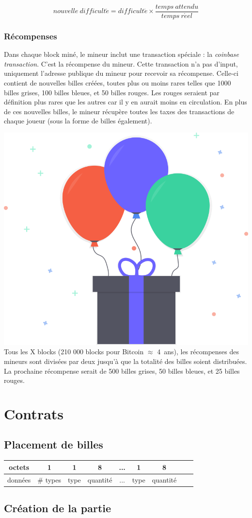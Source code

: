\documentclass{article}
\begin{document}
\[ nouvelle\ difficult\acute{e} = difficult\acute{e} \times \frac{temps\ attendu}{temps\ r\acute{e}el} \]

\subsubsection{Récompenses}
Dans chaque block miné, le mineur inclut une transaction spéciale : la \textit{coinbase transaction}. C'est la récompense du mineur.
Cette transaction n'a pas d'input, uniquement l'adresse publique du mineur pour recevoir sa récompense.
Celle-ci contient de nouvelles billes créées, toutes plus ou moins rares telles que 1000 billes grises, 100 billes bleues, et 50 billes rouges. Les rouges seraient par définition plus rares que les autres car il y en aurait moins en circulation.
En plus de ces nouvelles billes, le mineur récupère toutes les taxes des transactions de chaque joueur (sous la forme de billes également).

\includegraphics[width=0.3\linewidth]{assets/gift.png}\\

Tous les X blocks (210 000 blocks pour Bitcoin $\approx$ 4\ ans), les récompenses des mineurs sont divisées par deux jusqu'à que la totalité des billes soient distribuées.
La prochaine récompense serait de 500 billes grises, 50 billes bleues, et 25 billes rouges.

\section{Contrats}
\subsection*{Placement de billes}
\hspace*{-1cm}%
\begin{tabular}{ |c|c|c|c|c|c|c|c|c| } 
 \hline
octets & 1 & 1 & 8 & ... & 1 & 8\\ 
 \hline
    données & \# types & type & quantité & ... & type & quantité \\ 
 \hline
\end{tabular}
\subsection{Création de la partie}
\end{document}
